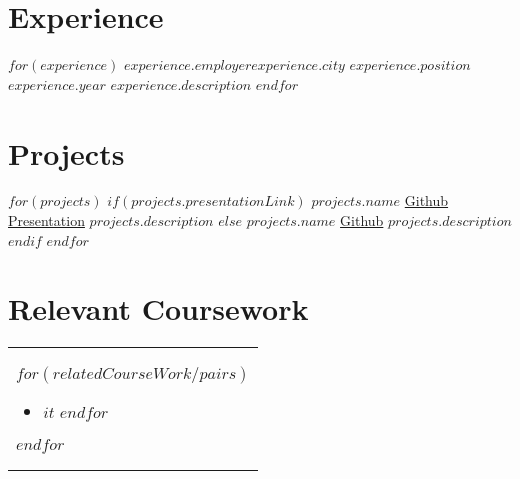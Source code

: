 \documentclass[10pt, a4paper]{article}
\begin{document}
\vspace{-.3cm} %

\section*{Experience}
  \resumeSubHeadingListStart
    $for(experience)$
      \resumeSubheadingExperience
        {$experience.employer$}{$experience.city$}
        {$experience.position$}{$experience.year$} 
        {$experience.description$}
    $endfor$
  \resumeSubHeadingListEnd

\vspace{-.3cm} %

\section*{Projects}
  \resumeSubHeadingListStart
      $for(projects)$
        $if(projects.presentationLink)$ %
        \makeProjectRowPres
          {$projects.name$}
            {\href{$projects.githubLink$}{Github}}
            {\href{$projects.presentationLink$}{Presentation}}
          {$projects.description$}
        $else$
        \makeProjectRowNoPres
          {$projects.name$}
            {\href{$projects.githubLink$}{Github}}
          {$projects.description$}
        $endif$
      $endfor$
  \resumeSubHeadingListEnd
  
\vspace{-.3cm} %

\section*{Relevant Coursework}
\begin{tabular}[t]{ @{}p{\textwidth} } %
  $for(relatedCourseWork/pairs)$
    \begin{minipage}[t]{.35\textwidth}
      \begin{itemize}[itemsep=-3pt,leftmargin=*]
        $for(it.value)$ %
          \item{$it$}
        $endfor$
      \end{itemize}
    \end{minipage}
  $endfor$
\end{tabular}
\end{document}

